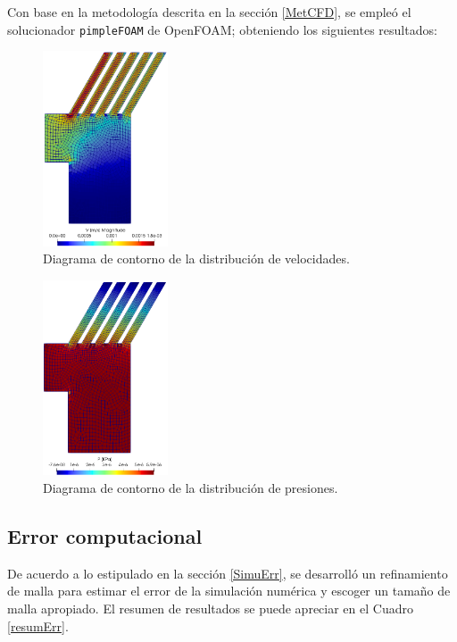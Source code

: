 \noindent
\justify

Con base en la metodolog\'ia descrita en la secci\'on \ref{MetCFD}, se emple\'o el solucionador \texttt{pimpleFOAM} de OpenFOAM; obteniendo los siguientes resultados:

\begin{figure}[h!]
	\centering
	\includegraphics[width=0.33\textwidth]{Images/CFD/vel1.png}
	\caption{Diagrama de contorno de la distribuci\'on de velocidades.}
	\label{CFD:vel}
\end{figure}

\begin{figure}[h!]
	\centering
	\includegraphics[width=0.33\textwidth]{Images/CFD/p1.png}
	\caption{Diagrama de contorno de la distribuci\'on de presiones.}
	\label{CFD:p}
\end{figure}

\subsection{Error computacional} \label{CompiError}

\noindent
\justify

De acuerdo a lo estipulado en la secci\'on \ref{SimuErr}, se desarroll\'o un refinamiento de malla para estimar el error de la simulaci\'on num\'erica y escoger un tama\~no de malla apropiado. El resumen de resultados se puede apreciar en el Cuadro \ref{resumErr}.

